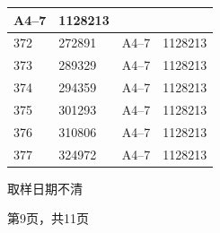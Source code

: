 \documentclass[UTF8,10pt,a4paper,fontset=fandol]{ctexart}
\newcommand{\fieldvalue}[1]{#1}
\newcommand{\handwritten}[1]{#1}
\begin{document}
\begin{center}
\begin{tabular}{|l|l|l|l|}
\fieldvalue{A4--7}&
\fieldvalue{1128213}\\
\hline
\fieldvalue{372}&
\fieldvalue{272891}&
\fieldvalue{A4--7}&
\fieldvalue{1128213}\\
\hline
\fieldvalue{373}&
\fieldvalue{289329}&
\fieldvalue{A4--7}&
\fieldvalue{1128213}\\
\hline
\fieldvalue{374}&
\fieldvalue{294359}&
\fieldvalue{A4--7}&
\fieldvalue{1128213}\\
\hline
\fieldvalue{375}&
\fieldvalue{301293}&
\fieldvalue{A4--7}&
\fieldvalue{1128213}\\
\hline
\fieldvalue{376}&
\fieldvalue{310806}&
\fieldvalue{A4--7}&
\fieldvalue{1128213}\\
\hline
\fieldvalue{377}&
\fieldvalue{324972}&
\fieldvalue{A4--7}&
\fieldvalue{1128213}\\
\hline
\end{tabular}

\handwritten{取样日期不清}

\end{center}
\begin{center}
第9页，共11页
\end{center}
\end{document}
